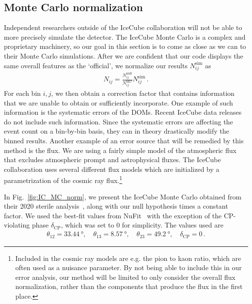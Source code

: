 \subsection*{Monte Carlo normalization}
Independent researchers outside of the IceCube collaboration will not be able to more precisely
simulate the detector. The IceCube Monte Carlo is a complex and proprietary machinery, so our goal in this 
section is to come as close as we can to their Monte Carlo simulations. After we are confident that 
our code displays the same overall features as the `official', we normalize our results $N_{ij}^\text{sim}$ as 
\begin{align}\label{eq:MC_norm}
    N_{ij} = \frac{N_{ij}^\text{null}}{N_{ij}^\text{MC}} N_{ij}^\text{sim}\,.
\end{align}
For each bin $i,j$, we then obtain a correction factor that contains information that we are unable
to obtain or sufficiently incorporate. One example of such information is the systematic errors of the DOMs.
Recent IceCube data releases do not include such information. Since the systematic errors are affecting the 
event count on a bin-by-bin basis, they can in theory drastically modify the binned results. Another example of
an error source that will be remedied by this method is the flux. We are using a fairly simple model of the atmospheric 
flux that excludes atmospheric prompt and astrophysical fluxes. The IceCube collaboration uses several different flux models which are initialized 
by a parametrization of the cosmic ray flux.\footnote{Included in the cosmic ray models are e.g. the pion to kaon 
ratio, which are often used as a nuisance parameter. By not being able to include this in our error analysis, our method will 
be limited to only consider the overall flux normalization, rather than the components that produce the flux in the first place.}

In Fig.~\ref{fig:IC_MC_norm}, we present the IceCube Monte Carlo obtained from their 2020 sterile analysis~\cite{IC2020}, along
with our null hypothesis times a constant factor. 
We used the best-fit values from NuFit~\cite{nufit} with the exception of the CP-violating phase $\delta_\text{CP}$, which was set to $0$ for simplicity. The values used are
\begin{align}\label{eq:nufitparams}
    \theta_{12} = \SI{33.44}{\degree},\hspace{1em} \theta_{13} = \SI{8.57}{\degree},\hspace{1em} \theta_{23} = \SI{49.2}{\degree}, \hspace{1em} \delta_\text{CP} = 0\,.
\end{align}

